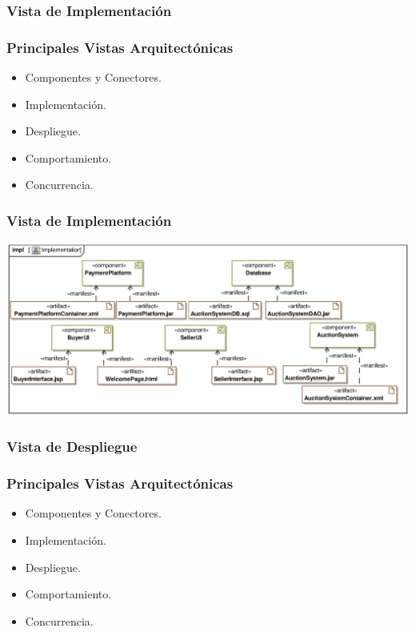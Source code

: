 ﻿\documentclass[handout,a4paper,slidestop,xcolor=pst,blue]{beamer}
\begin{document}
\subsubsection{Vista de Implementación}

\begin{frame}[c]
	\frametitle{Principales Vistas Arquitectónicas}
	\begin{itemize}
		\item Componentes y Conectores.
        \item \alert{Implementación}.
		\item Despliegue.
		\item Comportamiento.
		\item Concurrencia.
	\end{itemize}
\end{frame}

\begin{frame}[c]
	\frametitle{Vista de Implementación}
	\begin{center}
		\includegraphics[width=\linewidth]{images/architecturalViews/implementation.eps}
	\end{center}
\end{frame}

\subsubsection{Vista de Despliegue}

\begin{frame}[c]
	\frametitle{Principales Vistas Arquitectónicas}
	\begin{itemize}
		\item Componentes y Conectores.
        \item Implementación.
		\item \alert{Despliegue}.
		\item Comportamiento.
		\item Concurrencia.
	\end{itemize}
\end{frame}
\end{document}
